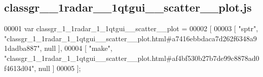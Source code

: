 \subsection{classgr\+\_\+\_\+1radar\+\_\+\_\+1qtgui\+\_\+\+\_\+scatter\+\_\+\+\_\+plot.\+js}
\label{classgr__1__1radar__1__1qtgui____scatter____plot_8js_source}

\begin{DoxyCode}
00001 var classgr_1_1radar_1_1qtgui__scatter__plot =
00002 [
00003     [ \textcolor{stringliteral}{"sptr"}, \textcolor{stringliteral}{"classgr\_1\_1radar\_1\_1qtgui\_\_scatter\_\_plot.html#a7416ebbdaca7d262f6348a91dadba887"}, null ],
00004     [ \textcolor{stringliteral}{"make"}, \textcolor{stringliteral}{"classgr\_1\_1radar\_1\_1qtgui\_\_scatter\_\_plot.html#af4bf530b27b7de99c8878ad0f4613d04"}, null ]
00005 ];
\end{DoxyCode}
